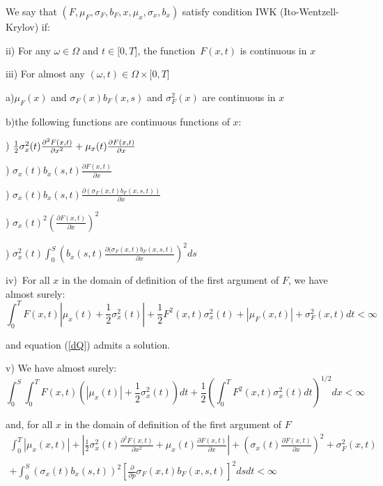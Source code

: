 \documentclass{article}
\begin{document}
We say that $(F,\mu _{F},\sigma _{F},b_{F},x,\mu _{x},\sigma _{x},b_{x})$
satisfy condition IWK (Ito-Wentzell-Krylov) if:

ii) For any $\omega \in \Omega $ and $t\in \lbrack 0,T]$, the function\ $%
F(x,t)$ is continuous in $x$

iii) For almost any $(\omega ,t)\in \Omega \times \lbrack 0,T]$

\qquad a)$\mu _{F}(x)$ and $\sigma _{F}(x)b_{F}(x,s)$ and $\sigma
_{F}^{2}(x) $ are continuous in $x$

\qquad b)the following functions are continuous functions of $x$:

\qquad {}) $\frac{1}{2}\sigma _{x}^{2}(t)\frac{\partial ^{2}F(x,t)}{%
\partial x^{2}}+\mu _{x}(t)\frac{\partial F(x,t)}{\partial x}$

\qquad {}) $\sigma _{x}(t)b_{x}(s,t)\frac{\partial F(x,t)}{\partial x}$

\qquad {}) $\sigma _{x}(t)b_{x}(s,t)\frac{\partial (\sigma
_{F}(x,t)b_{F}(x,s,t))}{\partial x}$

\qquad {}) $\sigma _{x}(t)^{2}(\frac{\partial F(x,t)}{\partial x})^{2}$

\qquad {}) $\sigma _{x}^{2}(t)\int_{0}^{S}(b_{x}(s,t)\frac{\partial
(\sigma _{F}(x,t)b_{F}(x,s,t)}{\partial x})^{2}ds$

iv)\ For all $x$ in the domain of definition of the first argument of $F$,
we have almost surely:%
\begin{equation*}
\int_{0}^{T}F(x,t)|\mu _{x}(t)+\frac{1}{2}\sigma _{x}^{2}(t)|+\frac{1}{2}%
F^{2}(x,t)\sigma _{x}^{2}(t)+|\mu _{F}(x,t)|+\sigma _{F}^{2}(x,t)dt<\infty
\end{equation*}

and equation (\ref{dQ}) admits a solution.

v) We have almost surely:%
\begin{equation*}
\int_{0}^{S}\int_{0}^{T}F(x,t)(|\mu _{x}(t)|+\frac{1}{2}\sigma
_{x}^{2}(t))dt+\frac{1}{2}(\int_{0}^{T}F^{2}(x,t)\sigma
_{x}^{2}(t)dt)^{1/2}dx<\infty \ 
\end{equation*}

\qquad and, for all $x$ in the domain of definition of the first argument of 
$F$%
\begin{gather*}
\int_{0}^{T}|\mu _{x}(x,t)|+|\frac{1}{2}\sigma _{x}^{2}(t)\frac{\partial
^{2}F(x,t)}{\partial x^{2}}+\mu _{x}(t)\frac{\partial F(x,t)}{\partial x}%
|+\left( \sigma _{x}(t)\frac{\partial F(x,t)}{\partial x}\right) ^{2}+\sigma
_{F}^{2}(x,t) \\
+\int_{0}^{S}(\sigma _{x}(t)b_{x}(s,t))^{2}[\frac{\partial }{\partial p}%
\sigma _{F}(x,t)b_{F}(x,s,t)]^{2}dsdt<\infty
\end{gather*}
\end{document}
